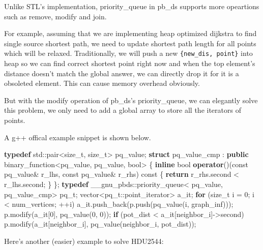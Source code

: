 \documentclass[
]{article}
\newenvironment{Shaded}{}{}
\newcommand{\AttributeTok}[1]{\textcolor[rgb]{0.49,0.56,0.16}{#1}}
\newcommand{\BuiltInTok}[1]{#1}
\newcommand{\ControlFlowTok}[1]{\textcolor[rgb]{0.00,0.44,0.13}{\textbf{#1}}}
\newcommand{\DataTypeTok}[1]{\textcolor[rgb]{0.56,0.13,0.00}{#1}}
\newcommand{\DecValTok}[1]{\textcolor[rgb]{0.25,0.63,0.44}{#1}}
\newcommand{\KeywordTok}[1]{\textcolor[rgb]{0.00,0.44,0.13}{\textbf{#1}}}
\newcommand{\NormalTok}[1]{#1}
\begin{document}
Unlike STL's implementation, priority\_queue in pb\_ds supports more
opeartions such as remove, modify and join.

For example, assuming that we are implementing heap optimized dijkstra
to find single source shortest path, we need to update shortest path
length for all points which will be relaxed. Traditionally, we will push
a new \texttt{\{new\_dis,\ point\}} into heap so we can find correct
shortest point right now and when the top element's distance doesn't
match the global answer, we can directly drop it for it is a obsoleted
element. This can cause memory overhead obviously.

But with the modify operation of pb\_ds's priority\_queue, we can
elegantly solve this problem, we only need to add a global array to
store all the iterators of points.

A g++ offical example snippet is shown below.

\begin{Shaded}
\begin{Highlighting}[]
\KeywordTok{typedef} \BuiltInTok{std::}\NormalTok{pair<}\DataTypeTok{size_t}\NormalTok{, }\DataTypeTok{size_t}\NormalTok{> pq_value;}
\KeywordTok{struct}\NormalTok{ pq_value_cmp : }\KeywordTok{public}\NormalTok{ binary_function<pq_value, pq_value, }\DataTypeTok{bool}\NormalTok{>}
\NormalTok{\{}
  \KeywordTok{inline} \DataTypeTok{bool}
  \KeywordTok{operator}\NormalTok{()(}\AttributeTok{const}\NormalTok{ pq_value& r_lhs, }\AttributeTok{const}\NormalTok{ pq_value& r_rhs) }\AttributeTok{const}
\NormalTok{  \{ }\ControlFlowTok{return}\NormalTok{ r_rhs.second < r_lhs.second; \}}
\NormalTok{\};}
\KeywordTok{typedef}\NormalTok{ __gnu_pbds::priority_queue< pq_value, pq_value_cmp> }\DataTypeTok{pq_t}\NormalTok{;}
\NormalTok{vector<}\DataTypeTok{pq_t}\NormalTok{::point_iterator> a_it;}
\ControlFlowTok{for}\NormalTok{ (}\DataTypeTok{size_t}\NormalTok{ i = }\DecValTok{0}\NormalTok{; i < num_vertices; ++i)}
\NormalTok{    a_it.push_back(p.push(pq_value(i, graph_inf)));}
\NormalTok{p.modify(a_it[}\DecValTok{0}\NormalTok{], pq_value(}\DecValTok{0}\NormalTok{, }\DecValTok{0}\NormalTok{));}
\ControlFlowTok{if}\NormalTok{ (pot_dist < a_it[neighbor_i]->second)}
\NormalTok{        p.modify(a_it[neighbor_i], pq_value(neighbor_i, pot_dist));}
\end{Highlighting}
\end{Shaded}

Here's another (easier) example to solve HDU2544:
\end{document}
